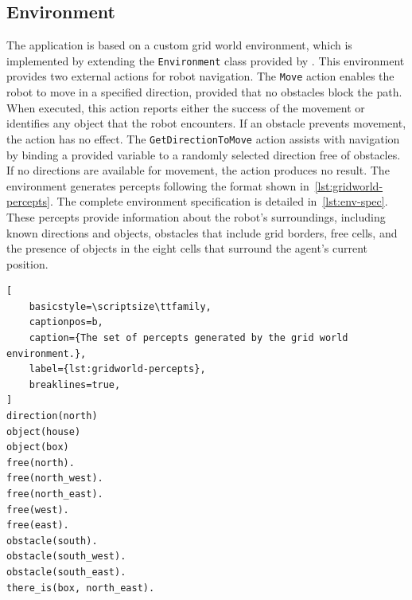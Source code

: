 \documentclass[12pt,a4paper,openright,twoside]{book}
\begin{document}


\subsection{Environment}\label{sec:explorer-environment}

The application is based on a custom grid world environment, which is implemented by extending the \texttt{Environment} class provided by \jakta{}. 
%
This environment provides two external actions for robot navigation.
%
The \texttt{Move} action enables the robot to move in a specified direction, provided that no obstacles block the path. When executed, this action reports either the success of the movement or identifies any object that the robot encounters.
%
If an obstacle prevents movement, the action has no effect.
%
The \texttt{GetDirectionToMove} action assists with navigation by binding a provided variable to a randomly selected direction free of obstacles.
%
If no directions are available for movement, the action produces no result.
%
The environment generates percepts following the format shown in~\cref{lst:gridworld-percepts}.
%
The complete environment specification is detailed in~\cref{lst:env-spec}. 
%
These percepts provide information about the robot's surroundings, including known directions and objects, obstacles that include grid borders, free cells, and the presence of objects in the eight cells that surround the agent's current position.

\begin{lstlisting}[
    basicstyle=\scriptsize\ttfamily,
    captionpos=b,
    caption={The set of percepts generated by the grid world environment.},
    label={lst:gridworld-percepts},
    breaklines=true,
]
direction(north)
object(house)
object(box)
free(north).
free(north_west).
free(north_east).
free(west).
free(east).
obstacle(south).
obstacle(south_west).
obstacle(south_east).
there_is(box, north_east).
\end{lstlisting}


\end{document}
